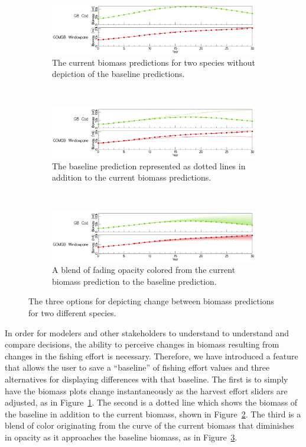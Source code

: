 \begin{figure}
\centering
	\begin{subfigure}[b]{0.8\textwidth}
		\centering
		\includegraphics[width=11cm]{figures/eps/msprod_change_none.eps}
		\caption{The current biomass predictions for two species without depiction of the baseline predictions.}
		\label{fig:changeNone}
	\end{subfigure}	\\
	\begin{subfigure}[b]{0.8\textwidth}
		\centering
		\includegraphics[width=11cm]{figures/eps/msprod_change_line.eps}
		\caption{The baseline prediction represented as dotted lines in addition to the current biomass predictions.}
		\label{fig:changeLine}
	\end{subfigure} \\
	\begin{subfigure}[b]{0.8\textwidth}
		\centering
		\includegraphics[width=11cm]{figures/eps/msprod_change_blend.eps}
		\caption{A blend of fading opacity colored from the current biomass prediction to the baseline prediction.}
		\label{fig:changeBlend}
	\end{subfigure}
	\caption{The three options for depicting change between biomass predictions for two different species.}
	\label{fig:changeTypes}
\end{figure}

In order for modelers and other stakeholders to understand to understand and compare decisions, the ability to perceive changes in biomass resulting from changes in the fishing effort is necessary.  Therefore, we have introduced a feature that allows the user to save a ``baseline'' of fishing effort values and three alternatives for displaying differences with that baseline.  The first is to simply have the biomass plots change instantaneously as the harvest effort sliders are adjusted, as in Figure~\ref{fig:changeNone}.  The second is a dotted line which shows the biomass of the baseline in addition to the current biomass, shown in Figure~\ref{fig:changeLine}.  The third is a blend of color originating from the curve of the current biomass that diminishes in opacity as it approaches the baseline biomass, as in Figure~\ref{fig:changeBlend}.


